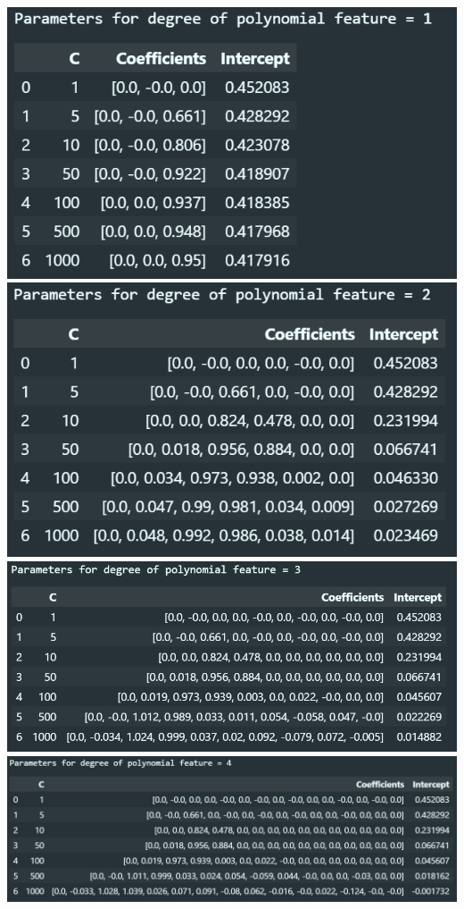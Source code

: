 \documentclass[10pt]{article}
\begin{document}
\begin{center}
  \includegraphics[scale=0.4]{./images/Table_1.png}
  \includegraphics[scale=0.4]{./images/Table_2.png}
  \vspace{5mm}
  \includegraphics[scale=0.4]{./images/Table_3.png}
  \vspace{5mm}
  \includegraphics[scale=0.4]{./images/Table_4.png}

\end{center}
\end{document}

